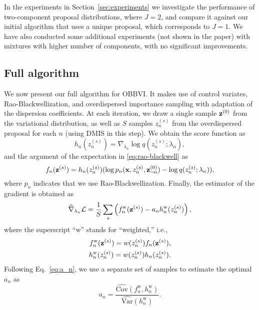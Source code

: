 \documentclass[]{article}
\begin{document}
In the experiments in Section~\ref{sec:experiments} we investigate the performance of two-component proposal distributions, where  $J=2$, and compare it against our initial algorithm that uses a unique proposal, which corresponds to $J=1$. We have also conducted some additional experiments (not shown in the paper) with mixtures with higher number of components, with no significant improvements.

\vspace*{-5pt}
\subsection{Full algorithm}
\vspace*{-5pt}

We now present our full algorithm for \gls{OBBVI}. It makes use of control variates, Rao-Blackwellization, and overdispersed importance sampling with adaptation of the dispersion coefficients. At each iteration, we draw a single sample $\mathbf{z}^{(0)}$ from the variational distribution, as well as $S$ samples $z_n^{(s)}$ from the overdispersed proposal for each $n$ (using \gls{DMIS} in this step). We obtain the score function as
\begin{equation}\label{eq:fullalg_hd}
  h_n(z_n^{(s)}) = \nabla_{\lambda_n} \log q(z_n^{(s)};\lambda_n),
\end{equation}
and the argument of the expectation in \eqref{eq:rao-blackwell} as
\begin{equation}\label{eq:fullalg_fd}
  f_n(\mathbf{z}^{(s)})=h_n(z_n^{(s)})(\log p_n(\mathbf{x},z_n^{(s)},\mathbf{z}_{\neg n}^{(0)})-\log q(z_n^{(s)};\lambda_n)),
\end{equation}
where $p_n$ indicates that we use Rao-Blackwellization. Finally, the estimator of the gradient is obtained as 
\begin{equation}\label{eq:fullalg_grad}
  \widehat{\nabla}_{\lambda_n}\mathcal{L} = \frac{1}{S}\sum_s \left(f^{\textrm{w}}_n(\mathbf{z}^{(s)})-a_n h_n^{\textrm{w}}(z_n^{(s)})\right),
\end{equation}
where the superscript ``${\textrm{w}}$'' stands for ``weighted,'' i.e.,
\begin{align}
  f^{\textrm{w}}_n(\mathbf{z}^{(s)})=w(z_n^{(s)})f_n(\mathbf{z}^{(s)}),\label{eq:fw}\\
  h^{\textrm{w}}_n(z_n^{(s)})=w(z_n^{(s)})h_n(z_n^{(s)}).\label{eq:hw}
\end{align}
Following Eq.~\ref{eq:a_n}, we use a separate set of samples to estimate the optimal $a_n$ as
\begin{equation}\label{eq:fullalg_optimal_ad}
  a_n=\frac{\widehat{\textrm{Cov}}(f^{\textrm{w}}_n,h^{\textrm{w}}_n)}{\widehat{\textrm{Var}}(h^{\textrm{w}}_n)}.
\end{equation}
\end{document}
